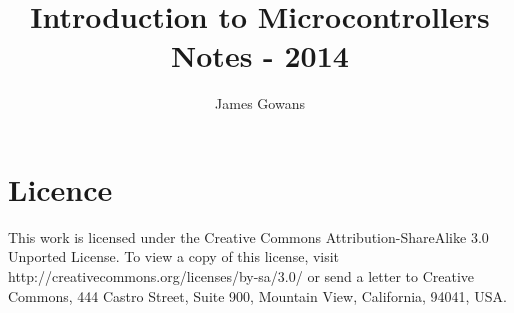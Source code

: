 \documentclass[twoside]{scrartcl}
\title{Introduction to Microcontrollers Notes - 2014}
\author{James Gowans}
\begin{document}
\maketitle
\section{Licence}
This work is licensed under the Creative Commons Attribution-ShareAlike 3.0 Unported License. To view a copy of this license, visit http://creativecommons.org/licenses/by-sa/3.0/ or send a letter to Creative Commons, 444 Castro Street, Suite 900, Mountain View, California, 94041, USA.

\newpage

\end{document}
